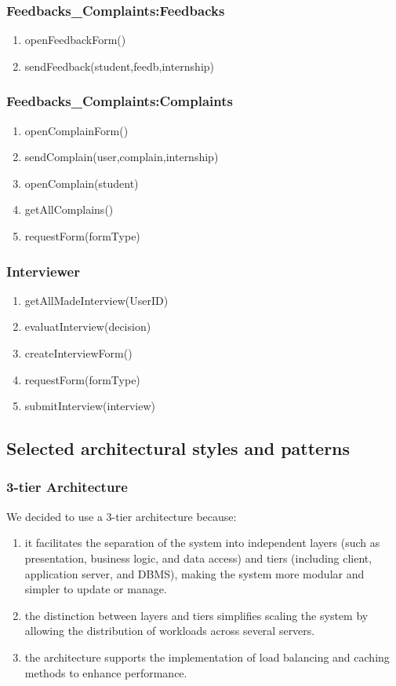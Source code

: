 \documentclass{article}
\begin{document}
\subsubsection{Feedbacks\_Complaints:Feedbacks}
\begin{enumerate}
    \item openFeedbackForm()
    \item sendFeedback(student,feedb,internship)
\end{enumerate}

\subsubsection{Feedbacks\_Complaints:Complaints}
\begin{enumerate}
    \item openComplainForm()
    \item sendComplain(user,complain,internship)
    \item openComplain(student)
    \item getAllComplains()
    \item requestForm(formType)
\end{enumerate}

\subsubsection{Interviewer}
\begin{enumerate}
    \item getAllMadeInterview(UserID)
    \item evaluatInterview(decision)
    \item createInterviewForm()
    \item requestForm(formType)
    \item submitInterview(interview)
\end{enumerate}


\subsection{Selected architectural styles and patterns}
\subsubsection{3-tier Architecture}
We decided to use a 3-tier architecture because:
\begin{enumerate} 
    \item it facilitates the separation of the system into independent layers (such as presentation, business logic, and data access) and tiers (including client, application server, and DBMS), making the system more modular and simpler to update or manage. 
    \item the distinction between layers and tiers simplifies scaling the system by allowing the distribution of workloads across several servers. 
    \item the architecture supports the implementation of load balancing and caching methods to enhance performance.
\end{enumerate}
\end{document}
